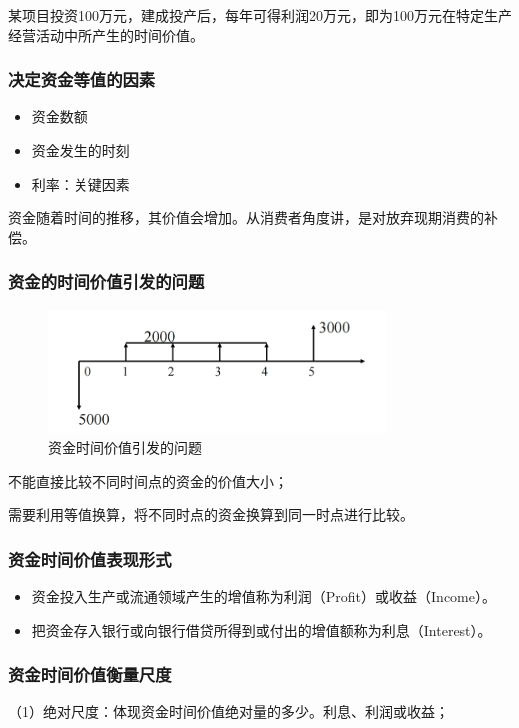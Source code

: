 \documentclass[12pt, a4paper, oneside]{ctexbook}
\begin{document}
某项目投资100万元，建成投产后，每年可得利润20万元，即为100万元在特定生产经营活动中所产生的时间价值。

\subsubsection{决定资金等值的因素}
\begin{itemize}
    \item 资金数额
    \item 资金发生的时刻
    \item 利率：关键因素
\end{itemize}

资金随着时间的推移，其价值会增加。从消费者角度讲，是对放弃现期消费的补偿。

\subsubsection{资金的时间价值引发的问题}

\begin{figure}[H]
    \centering
    \includegraphics[width=0.8\textwidth]{image/资金时间价值引发的问题.png}
    \caption{资金时间价值引发的问题}
    \label{fig:3}
\end{figure}

不能直接比较不同时间点的资金的价值大小；

需要利用等值换算，将不同时点的资金换算到同一时点进行比较。

\subsubsection{资金时间价值表现形式}
\begin{itemize}
    \item 资金投入生产或流通领域产生的增值称为利润（Profit）或收益（Income）。
    \item 把资金存入银行或向银行借贷所得到或付出的增值额称为利息（Interest）。
\end{itemize}

\subsubsection{资金时间价值衡量尺度}
（1）绝对尺度：体现资金时间价值绝对量的多少。利息、利润或收益；
\end{document}
